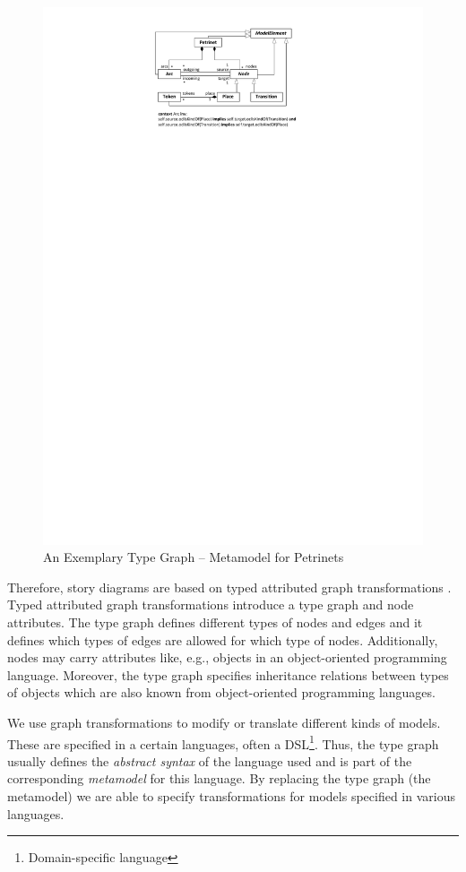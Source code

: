 \begin{figure}[htb]
  \centering
  \includegraphics[scale=1]{figures/Petrinet}
  \caption{An Exemplary Type Graph -- Metamodel for Petrinets}
  \label{fig:PetrinetTypeGraph}
\end{figure}

Therefore, story diagrams are based on typed attributed graph transformations \cite{EEPT06}. Typed attributed graph transformations introduce a type graph and node attributes. The type graph defines different types of nodes and edges and it defines which types of edges are allowed for which type of nodes. Additionally, nodes may carry attributes like, e.g., objects in an object-oriented programming language. Moreover, the type graph specifies inheritance relations between types of objects which are also known from object-oriented programming languages.

We use graph transformations to modify or translate different kinds of models.
These are specified in a certain languages, often a DSL\footnote{Domain-specific language}.
Thus, the type graph usually defines the \emph{abstract syntax} of the language used and is part of the corresponding \emph{metamodel} for this language.
By replacing the type graph (the metamodel) we are able to specify transformations for models specified in various languages.

